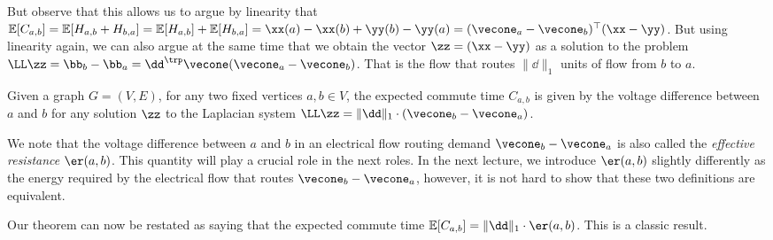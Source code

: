 But observe that this allows us to argue by linearity that $\mathbb{E}[C_{a,b}] = \mathbb{E}[H_{a,b} + H_{b,a}] = \mathbb{E}[H_{a,b}] + \mathbb{E}[H_{b,a}] = \xx(a) - \xx(b) + \yy(b) - \yy(a) = (\vecone_a - \vecone_b)^\top (\xx - \yy)$. But using linearity again, we can also argue at the same time that we obtain the vector $\zz = (\xx - \yy)$ as a solution to the problem $\LL\zz = \bb_b - \bb_a = \dd^\trp \vecone (\vecone_a - \vecone_b)$. That is the flow that routes $\|\dd\|_1$ units of flow from $b$ to $a$.

\begin{theorem}
	Given a graph $G=(V,E)$, for any two fixed vertices $a,b \in V$, the expected commute time $C_{a,b}$ is given by the voltage difference between $a$ and $b$ for any solution $\zz$ to the Laplacian system $\LL \zz = \|\dd\|_1 \cdot (\vecone_b - \vecone_a)$.
\end{theorem}

We note that the voltage difference between $a$ and $b$ in an electrical flow routing demand $\vecone_b - \vecone_a$ is also called the \emph{effective resistance} $\er(a,b)$. This quantity will play a crucial role in the next roles. In the next lecture, we introduce $\er(a,b)$ slightly differently as the energy required by the electrical flow that routes $\vecone_b - \vecone_a$, however, it is not hard to show that these two definitions are equivalent.

Our theorem can now be restated as saying that the expected commute time $\mathbb{E}[C_{a,b}] = \|\dd\|_1 \cdot \er(a,b)$. This is a classic result.
